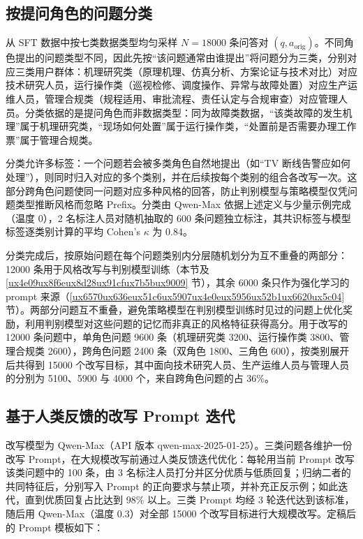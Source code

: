 \documentclass[fontset=fandol,type=master,campus=shenzhen,etitleauto=true]{hithesisbook}
\begin{document}
\subsection{按提问角色的问题分类}\label{subsec:question-classify}

从 SFT 数据中按七类数据类型均匀采样 $N = 18000$ 条问答对 $(q, a_{\text{orig}})$。不同角色提出的问题类型不同，因此先按“该问题通常由谁提出”将问题分为三类，分别对应三类用户群体：机理研究类（原理机理、仿真分析、方案论证与技术对比）对应技术研究人员，运行操作类（巡视检修、调度操作、异常与故障处置）对应生产运维人员，管理合规类（规程适用、审批流程、责任认定与合规审查）对应管理人员。分类依据的是提问角色而非数据类型：同为故障类数据，“该类故障的发生机理”属于机理研究类，“现场如何处置”属于运行操作类，“处置前是否需要办理工作票”属于管理合规类。

分类允许多标签：一个问题若会被多类角色自然地提出（如“TV 断线告警应如何处理”），则同时归入对应的多个类别，并在后续按每个类别的组合各改写一次。这部分跨角色问题使同一问题对应多种风格的回答，防止判别模型与策略模型仅凭问题类型推断风格而忽略 Prefix。分类由 Qwen-Max 依据上述定义与少量示例完成（温度 0），2 名标注人员对随机抽取的 600 条问题独立标注，其共识标签与模型标签逐类别计算的平均 Cohen's $\kappa$ 为 0.84。

分类完成后，按原始问题在每个问题类别内分层随机划分为互不重叠的两部分：12000 条用于风格改写与判别模型训练（本节及 \ref{ux4e09ux8f6eux8d28ux91cfux7b5bux9009} 节），其余 6000 条只作为强化学习的 prompt 来源（\ref{ux6570ux636eux51c6ux5907ux4e0eux5956ux52b1ux6620ux5c04} 节）。两部分问题互不重叠，避免策略模型在判别模型训练时见过的问题上优化奖励，利用判别模型对这些问题的记忆而非真正的风格特征获得高分。用于改写的 12000 条问题中，单角色问题 9600 条（机理研究类 3200、运行操作类 3800、管理合规类 2600），跨角色问题 2400 条（双角色 1800、三角色 600），按类别展开后共得到 15000 个改写目标，其中面向技术研究人员、生产运维人员与管理人员的分别为 5100、5900 与 4000 个，来自跨角色问题的占 36\%。

\subsection{基于人类反馈的改写 Prompt 迭代}\label{ux57faux4e8e-sft-ux6570ux636eux7684ux573aux666fux9002ux914dux6539ux5199}

改写模型为 Qwen-Max（API 版本 qwen-max-2025-01-25）。三类问题各维护一份改写 Prompt，在大规模改写前通过人类反馈迭代优化：每轮用当前 Prompt 改写该类问题中的 100 条，由 3 名标注人员打分并区分优质与低质回复；归纳二者的共同特征后，分别写入 Prompt 的正向要求与禁止项，并补充正反示例；如此迭代，直到优质回复占比达到 98\% 以上。三类 Prompt 均经 3 轮迭代达到该标准，随后用 Qwen-Max（温度 0.3）对全部 15000 个改写目标进行大规模改写。定稿后的 Prompt 模板如下：
\end{document}
